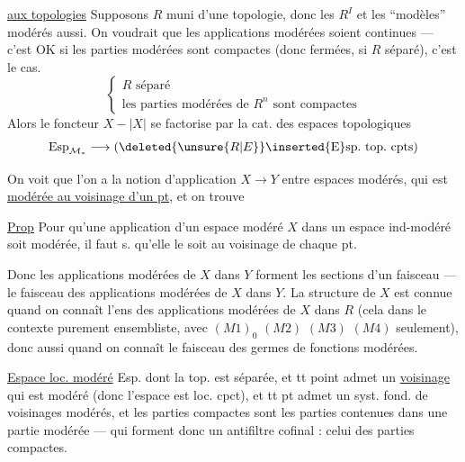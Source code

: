 \uline{ aux topologies} Supposons $R$ muni d'une topologie, donc les $R^I$ et les ``modèles'' modérés aussi. On voudrait que les applications modérées soient continues --- c'est OK si les parties modérées sont compactes (donc fermées, si $R$ séparé), c'est le cas.  
\[
 \left\{\begin{array}{l}R\text{ séparé}\\
 \text{les parties modérées de }R^n\text{ sont compactes}
 \end{array}\right.
\]
Alors le foncteur $X\mathbin{-}|X|$ se factorise par la cat. des espaces topologiques
\[
 \operatorname{Esp}_{\mathcal M_*}\longrightarrow(\deleted{\unsure{R|E}}\inserted{\mathrm E}\mathrm{sp.\ top.\ cpts})
\]

On voit  que l'on a la notion d'application $X\longrightarrow Y$ entre espaces modérés, qui est \uline{modérée au voisinage d'un pt}, et on trouve

\uline{Prop} Pour qu'une application d'un espace modéré $X$ dans un espace ind-modéré soit modérée, il faut s. qu'elle le soit au voisinage de chaque pt.

Donc les applications modérées de $X$ dans $Y$ forment les sections d'un faisceau --- le faisceau des applications modérées de $X$ dans $Y$. La structure  de $X$ est connue quand on connaît l'ens des applications modérées de $X$ dans $R$ (cela  dans le contexte purement ensembliste, avec $(M1)_0$ $(M2)$ $(M3)$ $(M4)$ seulement), donc aussi quand on connaît le faisceau des germes de fonctions modérées.

\uline{Espace loc. modéré} Esp.   dont la top. est  séparée, et tt point admet un \uline{voisinage} qui est  modéré (donc l'espace est loc. cpct), et tt pt admet un syst. fond. de voisinages modérés, et les parties compactes sont les parties contenues dans une partie modérée --- qui forment donc un antifiltre cofinal : celui des parties compactes.

